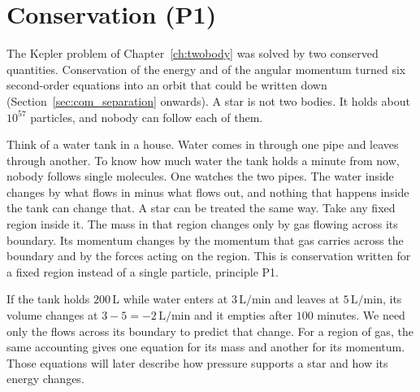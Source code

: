 \section{Conservation (P1)}
\label{pr:sec:p1}

The Kepler problem of Chapter~\ref{ch:twobody} was solved by two conserved quantities. Conservation of the energy and of the angular momentum turned six second-order equations into an orbit that could be written down (Section~\ref{sec:com_separation} onwards). A star is not two bodies. It holds about $10^{57}$ particles, and nobody can follow each of them.

Think of a water tank in a house. Water comes in through one pipe and leaves through another. To know how much water the tank holds a minute from now, nobody follows single molecules. One watches the two pipes. The water inside changes by what flows in minus what flows out, and nothing that happens inside the tank can change that. A star can be treated the same way. Take any fixed region inside it. The mass in that region changes only by gas flowing across its boundary. Its momentum changes by the momentum that gas carries across the boundary and by the forces acting on the region. This is conservation written for a fixed region instead of a single particle, principle P1.

If the tank holds $200\,\mathrm{L}$ while water enters at $3\,\mathrm{L/min}$ and leaves at $5\,\mathrm{L/min}$, its volume changes at $3-5=-2\,\mathrm{L/min}$ and it empties after $100$ minutes. We need only the flows across its boundary to predict that change. For a region of gas, the same accounting gives one equation for its mass and another for its momentum. Those equations will later describe how pressure supports a star and how its energy changes.

